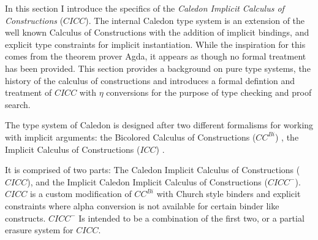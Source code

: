 In this section I introduce the specifics of the \textit{Caledon Implicit Calculus of Constructions} ($CICC$).
The internal Caledon type system is an extension of the well known Calculus of Constructions with the 
addition of implicit bindings, and explicit type constraints for implicit instantiation.  
While the inspiration for this comes from the theorem prover Agda, it appears as though no formal treatment
has been provided. This section provides a background on pure type systems, the history of the calculus of constructions
and introduces a formal defintion and treatment of $CICC$ with $\eta$ conversions for the purpose of type checking
and proof search.

The type system of Caledon is designed after two different formalisms for working with implicit arguments:  
the Bicolored Calculus of Constructions ($CC^{Bi}$) \citep{luther2001more}, 
the Implicit Calculus of Constructions ($ICC$) \citep{miquel2001implicit}.

It is comprised of two parts: The Caledon Implicit Calculus of Constructions ($CICC$), 
and the Implicit Caledon Implicit Calculus of Constructions ($CICC^-$). 
$CICC$ is a custom modification of $CC^{Bi}$ with Church style binders and explicit constraints 
where alpha conversion is not available for certain binder like constructs.
$CICC^-$ Is intended to be a combination of the first two, or a partial 
erasure system for $CICC$. 
